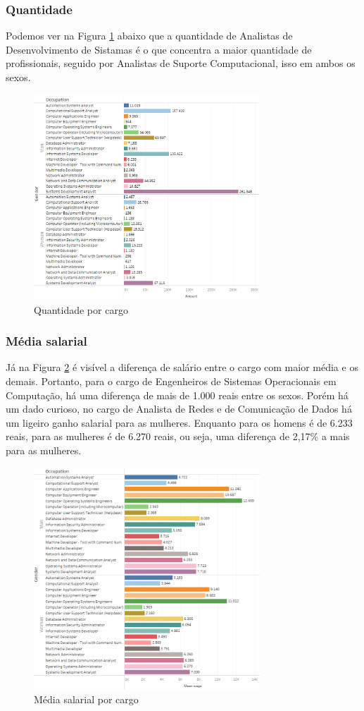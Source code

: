 \subsubsection{Quantidade}

Podemos ver na Figura \ref{fig_5_qnt_cbo} abaixo que a quantidade de Analistas de Desenvolvimento de Sistamas é o que concentra a maior quantidade de profissionais, seguido por Analistas de Suporte Computacional, isso em ambos os sexos. 

\begin{figure}[htbp]
	\centerline{
		\includegraphics[width=85mm]{assets/5_qnt_cbo.PNG}
	}
	\caption{Quantidade por cargo}
	\label{fig_5_qnt_cbo}
\end{figure}

\subsubsection{Média salarial}

Já na Figura \ref{fig_5_sal_cbo} é visível a diferença de salário entre o cargo com maior média e os demais. Portanto, para o cargo de Engenheiros de Sistemas Operacionais em Computação, há uma diferença de mais de 1.000 reais entre os sexos. Porém há um dado curioso, no cargo de Analista de Redes e de Comunicação de Dados há um ligeiro ganho salarial para as mulheres. Enquanto para os homens é de 6.233 reais, para as mulheres é de 6.270 reais, ou seja, uma diferença de 2,17\% a mais para as mulheres.

\begin{figure}[htbp]
	\centerline{
		\includegraphics[width=85mm]{assets/5_sal_cbo.PNG}
	}
	\caption{Média salarial por cargo}
	\label{fig_5_sal_cbo}
\end{figure}

